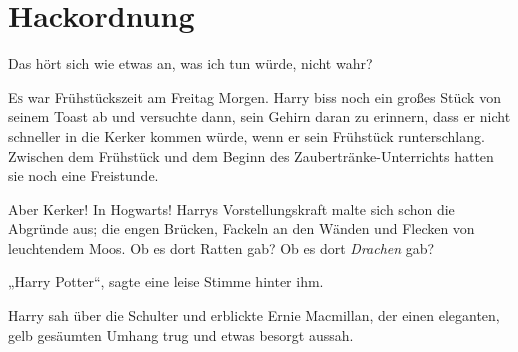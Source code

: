 \chapter{Hackordnung}

\begin{chapterOpeningAuthorNote}
\end{chapterOpeningAuthorNote}
\begin{chapterOpeningQuote}
Das hört sich wie etwas an, was ich tun würde, nicht wahr?
\end{chapterOpeningQuote}

\lettrine{E}{s} war Frühstückszeit am Freitag Morgen. Harry biss noch ein großes Stück von seinem Toast ab und versuchte dann, sein Gehirn daran zu erinnern, dass er nicht schneller in die Kerker kommen würde, wenn er sein Frühstück runterschlang. Zwischen dem Frühstück und dem Beginn des Zaubertränke-Unterrichts hatten sie noch eine Freistunde. 

Aber Kerker! In Hogwarts! Harrys Vorstellungskraft malte sich schon die Abgründe aus; die engen Brücken, Fackeln an den Wänden und Flecken von leuchtendem Moos. Ob es dort Ratten gab? Ob es dort \emph{Drachen} gab? 

„Harry Potter“, sagte eine leise Stimme hinter ihm. 

Harry sah über die Schulter und erblickte Ernie Macmillan, der einen eleganten, gelb gesäumten Umhang trug und etwas besorgt aussah. 

